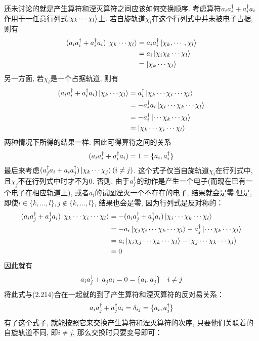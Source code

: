 还未讨论的就是产生算符和湮灭算符之间应该如何交换顺序. 考虑算符$a_ia^\dagger_i + a^\dagger_ia_i$作用于一任意行列式$\Ket{\chi_k\cdots\chi_l}$上. 若自旋轨道$\chi_i$在这个行列式中并未被电子占据, 则有
\begin{align}
(a_ia^\dagger_i + a^\dagger_ia_i) \Ket{\chi_k\cdots\chi_l} & = a_ia^\dagger_i \Ket{\chi_k,\cdots,\chi_l} \\
& = a_i\Ket{\chi_i\chi_k\cdots\chi_l} \\
& = \Ket{\chi_k\cdots\chi_l}
\end{align}
另一方面, 若$\chi_i$是一个占据轨道, 则有
\begin{align}
(a_ia^\dagger_i + a^\dagger_ia_i) \Ket{\chi_k\cdots\chi_l} & = a^\dagger_i \Ket{\chi_k\cdots\chi_i\cdots\chi_l} \\
& = -a^\dagger_i a_i \Ket{\chi_i\cdots\chi_k\cdots\chi_l} \\
& = -a^\dagger_i \Ket{\cdots\chi_k\cdots\chi_l} \\
& = \Ket{\chi_k\cdots\chi_i\cdots\chi_l}
\end{align}
两种情况下所得的结果一样. 因此可得算符之间的关系
\begin{align}
(a_ia^\dagger_i + a^\dagger_ia_i) = 1 = \{ a_i,a^\dagger_i \}
\end{align}
最后来考虑$(a^\dagger_ja_i + a_ia^\dagger_j)\Ket{\chi_k\cdots\chi_j}(i\neq j)$. 这个式子仅当自旋轨道$\chi_i$在行列式中, 且$\chi_j$不在行列式中时才不为$0$.  否则, 由于$a^\dagger_j$的动作是产生一个电子(而现在已有一个电子在相应轨道上), 或者$a_i$的试图湮灭一个不存在的电子, 结果就会是零.但是, 即使$i\in\{ k,\ldots,l \}, j\not\in\{ k,\ldots, l \}$, 结果也会是零, 因为行列式是反对称的：
\begin{align}
(a_ia^\dagger_j + a^\dagger_ja_i)\Ket{\chi_k\cdots\chi_i\cdots\chi_l} & = -(a_ia^\dagger_j + a^\dagger_ja_i) \Ket{\chi_i\cdots\chi_k\cdots\chi_l}\notag\\
& = -a_i\Ket{\chi_j\chi_i\cdots\chi_k\cdots\chi_l} - a^\dagger_j\Ket{\cdots\chi_k\cdots\chi_l}\notag\\
& = a_i\Ket{\chi_i\chi_j\cdots\chi_k\cdots\chi_l} - \Ket{\chi_j\cdots\chi_k\cdots\chi_l}\notag\\
& = 0
\end{align}
因此就有
\begin{align}
a_ia^\dagger_j + a^\dagger_ja_i = 0 = \{ a_i, a^\dagger_j \}\quad i\neq j
\end{align}
将此式与(2.214)合在一起就的到了产生算符和湮灭算符的反对易关系：
\begin{align}
a_ia^\dagger_j + a^\dagger_ja_i = \delta_{ij} = \{ a_i,a^\dagger_j \}
\end{align}
有了这个式子, 就能按照它来交换产生算符和湮灭算符的次序, 只要他们关联着的自旋轨道不同, 即$i\neq j$, 那么交换时只要变号即可：
